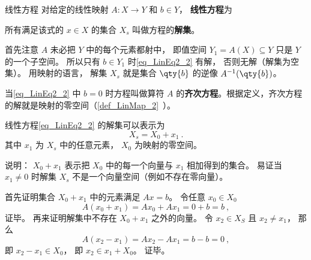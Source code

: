 
\begin{definition}{线性方程}
对给定的线性映射 $A:X\to Y$ 和 $b \in Y$， \textbf{线性方程}为

所有满足该式的 $x \in X$ 的集合 $X_s$ 叫做方程的\textbf{解集}。
\end{definition}

首先注意 $A$ 未必把 $Y$ 中的每个元素都射中， 即值空间 $Y_1 = A(X) \subseteq Y$ 只是 $Y$ 的一个子空间。 所以只有 $b \in Y_1$ 时\autoref{eq_LinEq2_2} 有解， 否则无解（解集为空集）。 用映射的语言， 解集 $X_s$ 就是集合 $\qty{b}$ 的逆像 $A^{-1}(\qty{b})$。

当\autoref{eq_LinEq2_2} 中 $b = 0$ 时方程叫做算符 $A$ 的\textbf{齐次方程}。根据定义，齐次方程的解就是映射的零空间（\autoref{def_LinMap_2}~）。

\begin{theorem}{}\label{the_LinEq2_1}
线性方程\autoref{eq_LinEq2_2} 的解集可以表示为
\begin{equation}\label{eq_LinEq2_1}
X_s = X_0 + x_1~.
\end{equation}
其中 $x_1$ 为 $X_s$ 中的任意元素，  $X_0$ 为映射的零空间。
\end{theorem}
说明： $X_0 + x_1$ 表示把 $X_0$ 中的每一个向量与 $x_1$ 相加得到的集合。 易证当 $x_1 \ne 0$ 时解集 $X_s$ 不是一个向量空间（例如不存在零向量）。

首先证明集合 $X_0 + x_1$ 中的元素满足 $Ax = b$。 令任意 $x_0 \in X_0$
\begin{equation}
A(x_0 + x_1) = Ax_0 + Ax_1 = 0 + b = b~,
\end{equation}
证毕。 再来证明解集中不存在 $X_0 + x_1$ 之外的向量。 令 $x_2 \in X_S$ 且 $x_2 \ne x_1$， 那么
\begin{equation}
A(x_2 - x_1) = Ax_2 - Ax_1 = b - b = 0~,
\end{equation}
即 $x_2 - x_1 \in X_0$， 即 $x_2 \in x_1 + X_0$。 证毕。


